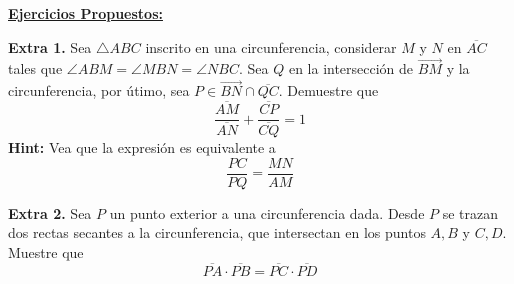 \documentclass{article}
\begin{document}
\vspace{1cm}
\noindent\textbf{\underline{Ejercicios Propuestos:}}

\vspace{5mm}
\noindent\textbf{Extra 1.} Sea $\triangle ABC$ inscrito en una circunferencia, considerar $M$
y $N$ en $\overline{AC}$ tales que $\angle ABM=\angle MBN=\angle NBC$. Sea $Q$ en la intersección
de $\overrightarrow{BM}$ y la circunferencia, por útimo, sea $P\in \overrightarrow{BN}\cap
\overline{QC}$. Demuestre que
\begin{equation*}
    \frac{\overline{AM}}{\overline{AN}}+\frac{\overline{CP}}{\overline{CQ}}=1
\end{equation*}
\textbf{Hint:} Vea que la expresión es equivalente a
\begin{equation*}
    \frac{PC}{PQ}=\frac{MN}{AM}
\end{equation*}

\vspace{5mm}
\noindent\textbf{Extra 2.} Sea $P$ un punto exterior a una circunferencia dada. Desde $P$ se
trazan dos rectas secantes a la circunferencia, que intersectan en los puntos $A,B$ y $C,D$. 
Muestre que
\begin{equation*}
    \overline{PA}\cdot\overline{PB}=\overline{PC}\cdot\overline{PD}
\end{equation*}

\end{document}
